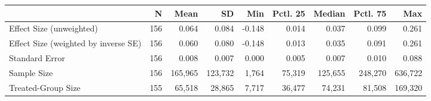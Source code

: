 \begin{tabular}{@{}l r r r r r r r r@{}}
\toprule
 & N & Mean & SD & Min & Pctl. 25 & Median & Pctl. 75 & Max \\
\midrule
Effect Size (unweighted) & 156 & 0.064 & 0.084 & -0.148 & 0.014 & 0.037 & 0.099 & 0.261 \\
Effect Size (weighted by inverse SE) & 156 & 0.060 & 0.080 & -0.148 & 0.013 & 0.035 & 0.091 & 0.261 \\
Standard Error & 156 & 0.008 & 0.007 & 0.000 & 0.005 & 0.007 & 0.010 & 0.088 \\
Sample Size & 156 & 165,965 & 123,732 & 1,764 & 75,319 & 125,655 & 248,270 & 636,722 \\
Treated-Group Size & 155 & 65,518 & 28,865 & 7,717 & 36,477 & 74,231 & 81,508 & 169,320 \\
\bottomrule
\end{tabular}